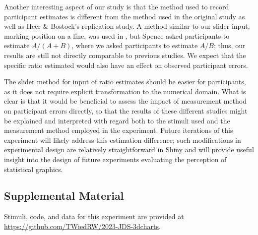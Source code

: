 \documentclass[letterpaper,inpress,dvipsnames]{jdsart}
\begin{document}
Another interesting aspect of our study is that the method used to record participant estimates is different from the method used in the original study as well as Heer \& Bostock's replication study.
A method similar to our slider input, marking position on a line, was used in \citet{spenceVisualPsychophysicsSimple1990}, but Spence asked participants to estimate \(A/(A+B)\), where we asked participants to estimate \(A/B\); thus, our results are still not directly comparable to previous studies.
We expect that the specific ratio estimated would also have an effect on observed participant errors.

The slider method for input of ratio estimates should be easier for participants, as it does not require explicit transformation to the numerical domain.
What is clear is that it would be beneficial to assess the impact of measurement method on participant errors directly, so that the results of these different studies might be explained and interpreted with regard both to the stimuli used and the measurement method employed in the experiment.
Future iterations of this experiment will likely address this estimation difference; such modifications in experimental design are relatively straightforward in Shiny and will provide useful insight into the design of future experiments evaluating the perception of statistical graphics.

\hypertarget{supplemental-material}{%
\subsection{Supplemental Material}\label{supplemental-material}}

Stimuli, code, and data for this experiment are provided at \url{https://github.com/TWiedRW/2023-JDS-3dcharts}.



\end{document}

